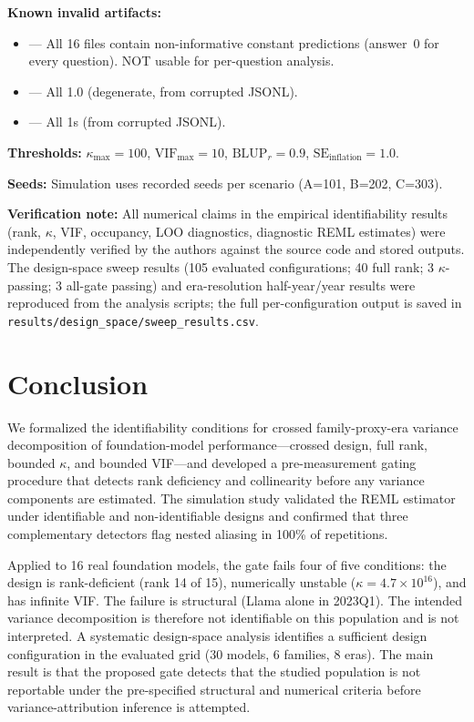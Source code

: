 \documentclass[11pt]{article}
\theoremstyle{definition}
\theoremstyle{plain}
\begin{document}
\textbf{Known invalid artifacts:}
\begin{itemize}
\item {} --- All 16 files contain non-informative constant predictions (answer~0 for every question). NOT usable for per-question analysis.
\item {} --- All 1.0 (degenerate, from corrupted JSONL).
\item {} --- All 1s (from corrupted JSONL).
\end{itemize}

\textbf{Thresholds:} $\kappa_{\max} = 100$, $\text{VIF}_{\max} = 10$, $\text{BLUP}_{r} = 0.9$, $\text{SE}_{\text{inflation}} = 1.0$.

\textbf{Seeds:} Simulation uses recorded seeds per scenario (A=101, B=202, C=303).

\textbf{Verification note:} All numerical claims in the empirical identifiability results (rank, $\kappa$, VIF, occupancy, LOO diagnostics, diagnostic REML estimates) were independently verified by the authors against the source code and stored outputs. The design-space sweep results (105 evaluated configurations; 40 full rank; 3 $\kappa$-passing; 3 all-gate passing) and era-resolution half-year/year results were reproduced from the analysis scripts; the full per-configuration output is saved in \texttt{results/design\_space/sweep\_results.csv}.

\section{Conclusion}
\label{sec:conclusion}

We formalized the identifiability conditions for crossed family-proxy-era variance decomposition of foundation-model performance---crossed design, full rank, bounded $\kappa$, and bounded VIF---and developed a pre-measurement gating procedure that detects rank deficiency and collinearity before any variance components are estimated. The simulation study validated the REML estimator under identifiable and non-identifiable designs and confirmed that three complementary detectors flag nested aliasing in 100\% of repetitions.

Applied to 16 real foundation models, the gate fails four of five conditions: the design is rank-deficient (rank 14 of 15), numerically unstable ($\kappa = 4.7 \times 10^{16}$), and has infinite VIF. The failure is structural (Llama alone in 2023Q1). The intended variance decomposition is therefore not identifiable on this population and is not interpreted. A systematic design-space analysis identifies a sufficient design configuration in the evaluated grid (30 models, 6 families, 8 eras). The main result is that the proposed gate detects that the studied population is not reportable under the pre-specified structural and numerical criteria before variance-attribution inference is attempted.
\end{document}
